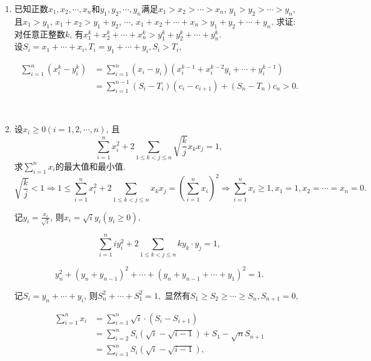 \documentclass[8pt]{article}
\begin{document}
\begin{enumerate}
		~\\

		\item 已知正数$x_1, x_2, \cdots, x_n$和$y_1, y_2, \cdots, y_n$满足$x_1 > x_2 > \cdots > x_n$, $y_1 > y_2 > \cdots > y_n$, 且$x_1 > y_1$, $x_1 + x_2 > y_1 + y_2$, $\cdots$, $x_1 + x_2 + \cdots + x_n > y_1 + y_2 + \cdots + y_n$. 求证: 对任意正整数$k$, 有$x_1^k + x_2^k + \cdots + x_n^k > y_1^k + y_2^k + \cdots + y_n^k.$
			~\\

			设$S_i = x_1 + \cdots + x_i, T_i = y_1 + \cdots + y_i, S_i > T_i,$

			\begin{align*}
				\sum_{i=1}^{n} (x_i^k - y_i^k) &= \sum_{i=1}^{n} (x_i - y_i) \left(x_i^{k-1} + x_i^{k-2} y_i + \cdots + y_i^{k-1}\right)\\
				&= \sum_{i=1}^{n-1} \left(S_i - T_i \right) \left(c_i - c_{i+1}\right) + (S_n - T_n)c_n > 0.
			\end{align*}

		~\\

		\item 设$x_i \geq 0 (i = 1, 2, \cdots, n)$, 且$$\sum_{i=1}^{n} x_i^2 + 2 \sum_{1\leq k<j\leq n} \sqrt{\frac{k}{j}} x_k x_j = 1,$$ 求$\displaystyle \sum_{i=1}^{n} x_i$的最大值和最小值.
			~\\

			$$\sqrt{\frac{k}{j}} < 1 \Rightarrow 1\leq \sum_{i=1}^{n} x_i^2 + 2\sum_{1\leq k<j\leq n} x_k x_j = \left(\sum_{i=1}^{n} x_i\right)^2 \Rightarrow \sum_{i=1}^{n} x_i \geq 1, x_1 = 1, x_2 = \cdots = x_n = 0.$$

			记$y_i = \frac{x_i}{\sqrt{i}}$, 则$x_i = \sqrt{i} y_i (y_i \geq 0),$

			$$\sum_{i=1}^{n} iy_i^2 + 2\sum_{1\leq k<j\leq n} k y_k \cdot y_j = 1,$$

			$$y_n^2 + (y_n + y_{n-1})^2 + \cdots + (y_n + y_{n-1} + \cdots + y_1)^2 = 1.$$

			记$S_i = y_n + \cdots + y_i$, 则$S_n^2 + \cdots + S_1^2 = 1,$ 显然有$S_1 \geq S_2 \geq \cdots \geq S_n, S_{n+1}=0,$

			\begin{align*}
				\sum_{i=1}^{n} x_i &= \sum_{i=1}^{n} \sqrt{i} \cdot \left(S_i - S_{i+1}\right)\\
				&= \sum_{i=2}^{n} S_i \left(\sqrt{i} - \sqrt{i-1}\right) + S_1 - \sqrt{n} S_{n+1}\\
				&= \sum_{i=1}^{n} S_i \left(\sqrt{i} - \sqrt{i-1}\right),
			\end{align*}


\end{enumerate}
\end{document}

